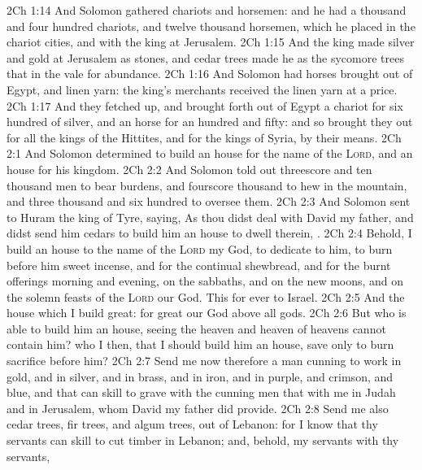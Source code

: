 \vs 2Ch 1:14 And Solomon gathered chariots and horsemen: and he had a thousand and four hundred chariots, and twelve thousand horsemen, which he placed in the chariot cities, and with the king at Jerusalem.
\vs 2Ch 1:15 And the king made silver and gold at Jerusalem  as stones, and cedar trees made he as the sycomore trees that  in the vale for abundance.
\vs 2Ch 1:16 And Solomon had horses brought out of Egypt, and linen yarn: the king's merchants received the linen yarn at a price.
\vs 2Ch 1:17 And they fetched up, and brought forth out of Egypt a chariot for six hundred  of silver, and an horse for an hundred and fifty: and so brought they out  for all the kings of the Hittites, and for the kings of Syria, by their means.
\vs 2Ch 2:1 And Solomon determined to build an house for the name of the \textsc{Lord}, and an house for his kingdom.
\vs 2Ch 2:2 And Solomon told out threescore and ten thousand men to bear burdens, and fourscore thousand to hew in the mountain, and three thousand and six hundred to oversee them.
\vs 2Ch 2:3 And Solomon sent to Huram the king of Tyre, saying, As thou didst deal with David my father, and didst send him cedars to build him an house to dwell therein, .
\vs 2Ch 2:4 Behold, I build an house to the name of the \textsc{Lord} my God, to dedicate  to him,  to burn before him sweet incense, and for the continual shewbread, and for the burnt offerings morning and evening, on the sabbaths, and on the new moons, and on the solemn feasts of the \textsc{Lord} our God. This  for ever to Israel.
\vs 2Ch 2:5 And the house which I build  great: for great  our God above all gods.
\vs 2Ch 2:6 But who is able to build him an house, seeing the heaven and heaven of heavens cannot contain him? who  I then, that I should build him an house, save only to burn sacrifice before him?
\vs 2Ch 2:7 Send me now therefore a man cunning to work in gold, and in silver, and in brass, and in iron, and in purple, and crimson, and blue, and that can skill to grave with the cunning men that  with me in Judah and in Jerusalem, whom David my father did provide.
\vs 2Ch 2:8 Send me also cedar trees, fir trees, and algum trees, out of Lebanon: for I know that thy servants can skill to cut timber in Lebanon; and, behold, my servants  with thy servants,

